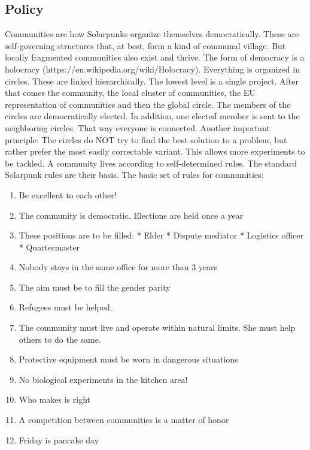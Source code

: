 \subsection{Policy}
Communities are how Solarpunks organize themselves democratically. These are self-governing structures that, at best, form a kind of communal village. But locally fragmented communities also exist and thrive. The form of democracy is a holocracy (https://en.wikipedia.org/wiki/Holocracy). Everything is organized in circles. These are linked hierarchically. The lowest level is a single project. After that comes the community, the local cluster of communities, the EU
representation of communities and then the global circle.
The members of the circles are democratically elected. In addition, one elected member is sent to the neighboring circles. That way everyone is connected. Another important principle: The circles do NOT try to find the best solution to a problem, but rather prefer the most easily correctable variant. This allows more experiments to be tackled.
A community lives according to self-determined rules. The standard Solarpunk rules are their basis.
The basic set of rules for communities:
\begin{enumerate}
    \item Be excellent to each other!
    \item The community is democratic. Elections are held once a year
    \item These positions are to be filled: * Elder * Dispute mediator * Logistics officer * Quartermaster
    \item Nobody stays in the same office for more than 3 years
    \item The aim must be to fill the gender parity
    \item Refugees must be helped.
    \item The community must live and operate within natural limits. She must help others to do the same.
    \item Protective equipment must be worn in dangerous situations
    \item No biological experiments in the kitchen area!
    \item Who makes is right
    \item A competition between communities is a matter of honor
    \item Friday is pancake day
\end{enumerate}

